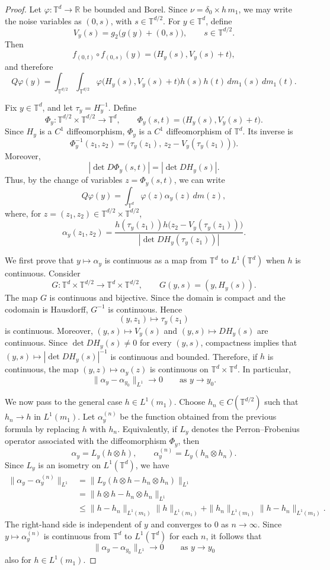 \documentclass[a4paper,12pt,reqno]{amsart}
\numberwithin{equation}{section}
\newcommand{\Rr}{{\mathbb{R}}}
\newcommand{\Tt}{{\mathbb{T}}}
\begin{document}
\begin{proof}
Let $\varphi\colon\Tt^d\to\Rr$ be bounded and Borel. Since $\nu=\delta_0\times h\,m_1$, we may write the noise variables as $(0,s)$, with $s\in\Tt^{d/2}$. For $y\in\Tt^d$, define
\[
V_y(s)=g_2\bigl(g(y)+(0,s)\bigr),
\qquad s\in\Tt^{d/2}.
\]
Then
\[
f_{(0,t)}\circ f_{(0,s)}(y)
=
\bigl(H_y(s),V_y(s)+t\bigr),
\]
and therefore
\[
Q\varphi(y)
=
\int_{\Tt^{d/2}}\int_{\Tt^{d/2}}
\varphi\bigl(H_y(s),V_y(s)+t\bigr)h(s)h(t)\,dm_1(s)\,dm_1(t).
\]

Fix $y\in\Tt^d$, and let $\tau_y=H_y^{-1}$. Define
\[
\Phi_y\colon\Tt^{d/2}\times\Tt^{d/2}\to\Tt^d, \qquad \Phi_y(s,t)=\bigl(H_y(s),V_y(s)+t\bigr).
\]
Since $H_y$ is a $C^1$ diffeomorphism, $\Phi_y$ is a $C^1$ diffeomorphism of $\Tt^d$. Its inverse is
\[
\Phi_y^{-1}(z_1,z_2)
=
\bigl(\tau_y(z_1),\,z_2-V_y(\tau_y(z_1))\bigr).
\]
Moreover,
\[
\left|\det D\Phi_y(s,t)\right|
=
\left|\det DH_y(s)\right|.
\]
Thus, by the change of variables $z=\Phi_y(s,t)$, we can write
\[
Q\varphi(y)
=
\int_{\Tt^d}\varphi(z)\alpha_y(z)\,dm(z),
\]
where, for $z=(z_1,z_2)\in\Tt^{d/2}\times\Tt^{d/2}$,
\[
\alpha_y(z_1,z_2)
=
\frac{
h(\tau_y(z_1))
h\bigl(z_2-V_y(\tau_y(z_1))\bigr)
}{
\left|\det DH_y(\tau_y(z_1))\right|
}.
\]

We first prove that $y\mapsto\alpha_y$ is continuous as a map from $\Tt^d$ to $L^1(\Tt^d)$ when $h$ is continuous. Consider
\[
G\colon\Tt^d\times\Tt^{d/2}\to\Tt^d\times\Tt^{d/2},
\qquad
G(y,s)=(y,H_y(s)).
\]
The map $G$ is continuous and bijective. Since the domain is compact and the codomain is Hausdorff, $G^{-1}$ is continuous. Hence
\[
(y,z_1)\mapsto \tau_y(z_1)
\]
is continuous. Moreover, $(y,s)\mapsto V_y(s)$ and $(y,s)\mapsto DH_y(s)$ are continuous. Since $\det DH_y(s)\neq 0$ for every $(y,s)$, compactness implies that
$(y,s)\mapsto \left|\det DH_y(s)\right|^{-1}$ is continuous and bounded. Therefore, if $h$ is continuous, the map $(y,z)\mapsto \alpha_y(z)$ is continuous on $\Tt^d\times\Tt^d$. In particular,
\[
\|\alpha_y-\alpha_{y_0}\|_{L^1}\longrightarrow 0
\qquad\text{as }y\to y_0.
\]

We now pass to the general case $h\in L^1(m_1)$. Choose $h_n\in C(\Tt^{d/2})$ such that $h_n\to h$ in $L^1(m_1)$. Let $\alpha_y^{(n)}$ be the function obtained from the previous formula by replacing $h$ with $h_n$. Equivalently, if $L_y$ denotes the Perron--Frobenius operator associated with the diffeomorphism $\Phi_y$, then
\[
\alpha_y=L_y(h\otimes h),
\qquad
\alpha_y^{(n)}=L_y(h_n\otimes h_n).
\]
Since $L_y$ is an isometry on $L^1(\Tt^d)$, we have
\[
\begin{aligned}
\|\alpha_y-\alpha_y^{(n)}\|_{L^1}
&=
\|L_y(h\otimes h-h_n\otimes h_n)\|_{L^1} \\
&=
\|h\otimes h-h_n\otimes h_n\|_{L^1} \\
&\leq
\|h-h_n\|_{L^1(m_1)}\|h\|_{L^1(m_1)}
+
\|h_n\|_{L^1(m_1)}\|h-h_n\|_{L^1(m_1)}.
\end{aligned}
\]
The right-hand side is independent of $y$ and converges to $0$ as $n\to\infty$. Since $y\mapsto\alpha_y^{(n)}$ is continuous from $\Tt^d$ to $L^1(\Tt^d)$ for each $n$, it follows that
\[
\|\alpha_y-\alpha_{y_0}\|_{L^1}\longrightarrow 0
\qquad\text{as }y\to y_0
\]
also for $h\in L^1(m_1)$.


\end{proof}
\end{document}
